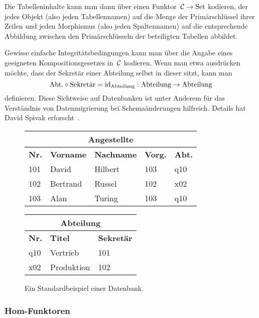 Die Tabelleninhalte kann man dann über einen Funktor~$\mathcal{C} \to \mathrm{Set}$ kodieren,
der jedes Objekt (also jeden Tabellennamen) auf die Menge der Primärschlüssel
ihrer Zeilen und jeden Morphismus (also jeden Spaltennamen) auf die
entsprechende Abbildung zwischen den Primärschlüsseln der beteiligten Tabellen
abbildet.

Gewisse einfache Integritätsbedingungen kann man über die Angabe eines
geeigneten Kompositionsgesetzes in~$\mathcal{C}$ kodieren. Wenn man etwa ausdrücken
möchte, dass der Sekretär einer Abteilung selbst in dieser sitzt, kann man
\[ \text{Abt.} \circ \text{Sekretär} = \mathrm{id}_{\text{Abteilung}} :
  \text{Abteilung} \to \text{Abteilung} \]
definieren. Diese Sichtweise auf Datenbanken ist unter Anderem für das
Verständnis von Datenmigrierung bei Schemaänderungen hilfreich. Details hat
David Spivak erforscht~\cite{spivak1,spivak2,spivak3}.

\begin{figure}
  \begin{center}
    \small
    \begin{tabular}{|l||l|l|l|l|}
      \hline
      \multicolumn{5}{|c|}{Angestellte} \\ \hline
      \textbf{Nr.} & \textbf{Vorname} & \textbf{Nachname} & \textbf{Vorg.} & \textbf{Abt.} \\ \hline
      101 & David & Hilbert & 103 & q10 \\
      102 & Bertrand & Russel & 102 & x02 \\
      103 & Alan & Turing & 103 & q10 \\
      \hline
    \end{tabular}
    \quad
    \begin{tabular}{|l||l|l|}
      \hline
      \multicolumn{3}{|c|}{Abteilung} \\ \hline
      \textbf{Nr.} & \textbf{Titel} & \textbf{Sekretär} \\ \hline
      q10 & Vertrieb & 101 \\
      x02 & Produktion & 102 \\
      \hline
    \end{tabular}
  \end{center}

  \caption{\label{db0815}Ein Standardbeispiel einer Datenbank.}
\end{figure}

\subsubsection{Hom-Funktoren}

